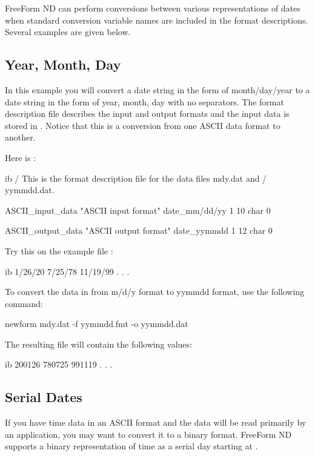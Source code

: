 FreeForm ND can perform conversions between various representations of
dates when standard conversion variable names are included in the
format descriptions. Several examples are given below.

\subsection{Year, Month, Day}

In this example you will convert a date string in the form of
month/day/year to a date string in the form of year, month, day with
no separators. The format description file  describes the
input and output formats and the input data is stored in .
Notice that this is a conversion from one ASCII data format to
another.

Here is :

\begin{vcode}{ib}
/ This is the format description file for the data files mdy.dat and
/ yymmdd.dat.

ASCII_input_data "ASCII input format"
date_mm/dd/yy 1 10 char 0

ASCII_output_data "ASCII output format"
date_yymmdd 1 12 char 0
\end{vcode}

Try this on the example file :

\begin{vcode}{ib}
 1/26/20
 7/25/78
11/19/99
     .
     .
     . 
\end{vcode}

To convert the data in  from m/d/y format to yymmdd format, use
the following command:

\begin{example}
newform mdy.dat -f yymmdd.fmt -o yymmdd.dat 
\end{example}

The resulting file  will contain the following values: 

\begin{vcode}{ib}
200126
780725
991119
  .
  .
  . 
\end{vcode}

\subsection{Serial Dates}

If you have time data in an ASCII format and the data will be read
primarily by an application, you may want to convert it to a binary
format. FreeForm ND supports a binary representation of time as a
serial day starting at .

